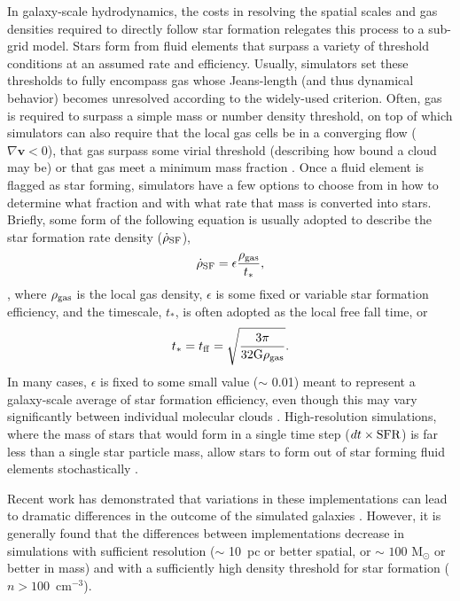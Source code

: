 In galaxy-scale hydrodynamics, the costs in resolving the spatial scales and gas densities required to directly follow star formation relegates this process to a sub-grid model. Stars form from fluid elements that surpass a variety of threshold conditions at an assumed rate and efficiency. Usually, simulators set these thresholds to fully encompass gas whose Jeans-length (and thus dynamical behavior) becomes unresolved according to the widely-used \cite{Truelove1997} criterion. Often, gas is required to surpass a simple mass or number density threshold, on top of which simulators can also require that the local gas cells be in a converging flow ($\nabla \bm{v} < 0$), that gas surpass some virial threshold (describing how bound a cloud may be)
or that gas meet a minimum \Hmolecular mass fraction \citep[e.g.][]{Kuhlen2012}
. Once a fluid element is flagged as star forming, simulators have a few options to choose from in how to determine what fraction and with what rate that mass is converted into stars. Briefly, some form of the following equation is usually adopted to describe the star formation rate density ($\dot{\rho}_{\rm SF}$),
\begin{equation}
\label{intro:eq:sfr}
 \dot{\rho}_{\rm SF} = \epsilon \frac{\rho_{\rm gas}}{t_*},
\end{equation}
, where $\rho_{\rm gas}$ is the local gas density, $\epsilon$ is some fixed or variable star formation efficiency, and the timescale, $t_*$, is often adopted as the local free fall time, or
\begin{equation}
  t_* = t_{\rm ff} = \sqrt{\frac{3\pi}{32 \rm{G} \rho_{\rm gas}}}.
\end{equation}
In many cases, $\epsilon$ is fixed to some small value ($\sim$ 0.01) \citep{KrumholzTan2007} meant to represent a galaxy-scale average of star formation efficiency, even though this may vary significantly between individual molecular clouds \citep{Grudic2018}. High-resolution simulations, where the mass of stars that would form in a single time step ($dt \times \rm{SFR}$) is far less than a single star particle mass, allow stars to form out of star forming fluid elements stochastically \citep[e.g.][]{Goldbaum2015}.

Recent work has demonstrated that variations in these implementations can lead to dramatic differences in the outcome of the simulated galaxies \citep[e.g.][]{Hopkins2013,Munshi2018}. However, it is generally found that the differences between implementations decrease in simulations with sufficient resolution ($\sim$ 10~pc or better spatial, or $\sim$ $100$ M$_{\odot}$ or better in mass) and with a sufficiently high density threshold for star formation ($n > 100$~cm$^{-3}$). 

